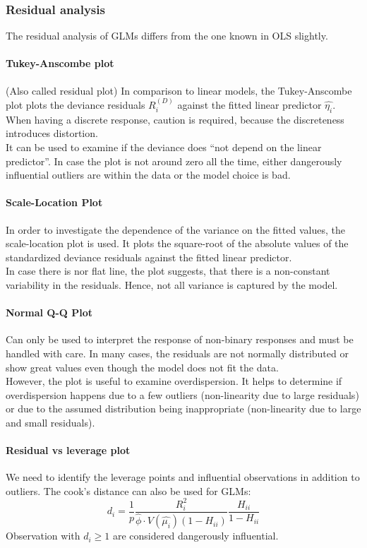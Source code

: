 \subsubsection{Residual analysis}
The residual analysis of GLMs differs from the one known in OLS slightly.

\paragraph{Tukey-Anscombe plot}
(Also called residual plot) In comparison to linear models, the Tukey-Anscombe plot plots the deviance residuals $R_i^{(D)}$ against the fitted linear predictor $\hat{\eta_i}$. When having a discrete response, caution is required, because the discreteness introduces distortion.\\
It can be used to examine if the deviance does ``not depend on the linear predictor''. In case the plot is not around zero all the time, either dangerously influential outliers are within the data or the model choice is bad.

\paragraph{Scale-Location Plot}
In order to investigate the dependence of the variance on the fitted values, the scale-location plot is used. It plots the square-root of the absolute values of the standardized deviance residuals against the fitted linear predictor.\\
In case there is nor flat line, the plot suggests, that there is a non-constant variability in the residuals. Hence, not all variance is captured by the model.

\paragraph{Normal Q-Q Plot}
Can only be used to interpret the response of non-binary responses and must be handled with care. In many cases, the residuals are not normally distributed or show great values even though the model does not fit the data.\\
However, the plot is useful to examine overdispersion. It helps to determine if overdispersion happens due to a few outliers (non-linearity due to large residuals) or due to the assumed distribution being inappropriate (non-linearity due to large and small residuals).

\paragraph{Residual vs leverage plot}
We need to identify the leverage points and influential observations in addition to outliers. The cook's distance can also be used for GLMs:
\begin{equation*}
d_i = \frac{1}{p}\frac{R_i^2}{\hat{\phi}\cdot V(\hat{\mu_i})(1-H_{ii})}\frac{H_{ii}}{1-H_{ii}}
\end{equation*}
Observation with $d_i \geq 1$ are considered dangerously influential.

